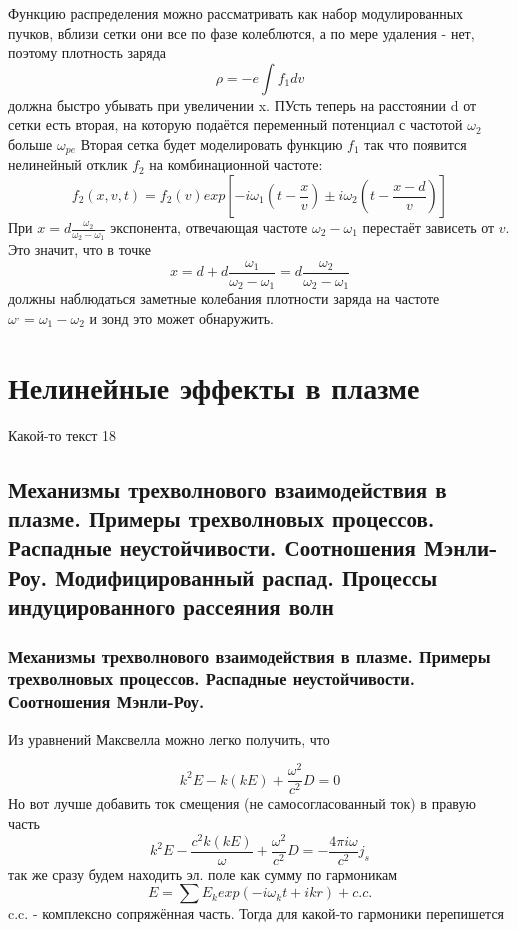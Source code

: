 \documentclass[10pt, a4paper]{article}
\let\stdsection\section
\renewcommand\section{\newpage\stdsection}
\begin{document}
Функцию распределения можно рассматривать как набор модулированных пучков, вблизи сетки они все по фазе колеблются, а по мере удаления - нет, поэтому плотность заряда
\begin{equation}
	\rho = -e \int f_1 dv
\end{equation}
должна быстро убывать при увеличении x.
ПУсть теперь на расстоянии d от сетки есть вторая, на которую подаётся переменный потенциал с частотой $\omega_2$ больше $\omega_{pe}$
Вторая сетка будет моделировать функцию $f_1$ так что появится нелинейный отклик $f_2$ на комбинационной частоте:
\begin{equation}
	f_2 (x,v,t)=f_2 (v) exp[-i \omega_1 (t-\frac{x}{v}) \pm i \omega_2 (t- \frac{x-d}{v})]
\end{equation}
При $x=d\frac{\omega_2}{\omega_2-\omega_1}$ экспонента, отвечающая частоте $\omega_2-\omega_1$ перестаёт зависеть от $v$. Это значит, что в точке
\begin{equation}
	x=d+d \frac{\omega_1}{\omega_2-\omega_1}=d  \frac{\omega_2}{\omega_2-\omega_1}
\end{equation}
должны наблюдаться заметные колебания плотности заряда на частоте $\omega^{,} = \omega_1-\omega_2 $ и зонд это может обнаружить.


\section{Нелинейные эффекты в плазме}

Какой-то текст 18

\subsection{Механизмы трехволнового взаимодействия в плазме. Примеры трехволновых процессов. Распадные неустойчивости. Соотношения Мэнли-Роу. Модифицированный распад. Процессы индуцированного рассеяния волн}
\label{subsec:3waveinterractive}

\subsubsection{Механизмы трехволнового взаимодействия в плазме. Примеры трехволновых процессов. Распадные неустойчивости. Соотношения Мэнли-Роу.}

Из уравнений Максвелла можно легко получить, что

\begin{equation}
	k^2 E - k (kE)+\frac{\omega^2}{c^2} D =0
\end{equation}
Но вот лучше добавить ток смещения (не самосогласованный ток) в правую часть
\begin{equation}
	k^2 E - \frac{c^2 k (kE)}{\omega}+\frac{\omega^2}{c^2} D =-\frac{4 \pi i \omega}{c^2} j_{s}
\end{equation}
так же сразу будем находить эл. поле как сумму по гармоникам
\begin{equation}
	E=\sum E_k exp(-i \omega_k t + ikr) + c.c.
\end{equation}
c.c. - комплексно сопряжённая часть.
Тогда для какой-то гармоники перепишется 
\end{document}
